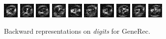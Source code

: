 \begin{figure}[h]
  \centering
  \includegraphics{../presentation/img/dig_0.png} 
  \includegraphics{../presentation/img/dig_1.png} 
  \includegraphics{../presentation/img/dig_2.png} 
  \includegraphics{../presentation/img/dig_3.png} 
  \includegraphics{../presentation/img/dig_4.png} 
  \includegraphics{../presentation/img/dig_5.png} 
  \includegraphics{../presentation/img/dig_6.png} 
  \includegraphics{../presentation/img/dig_7.png} 
  \includegraphics{../presentation/img/dig_8.png} 
  \includegraphics{../presentation/img/dig_9.png} 
  \caption{Backward representations on \emph{digits} for GeneRec.}
  \label{fig:results-backward-repre-generec}
\end{figure}

